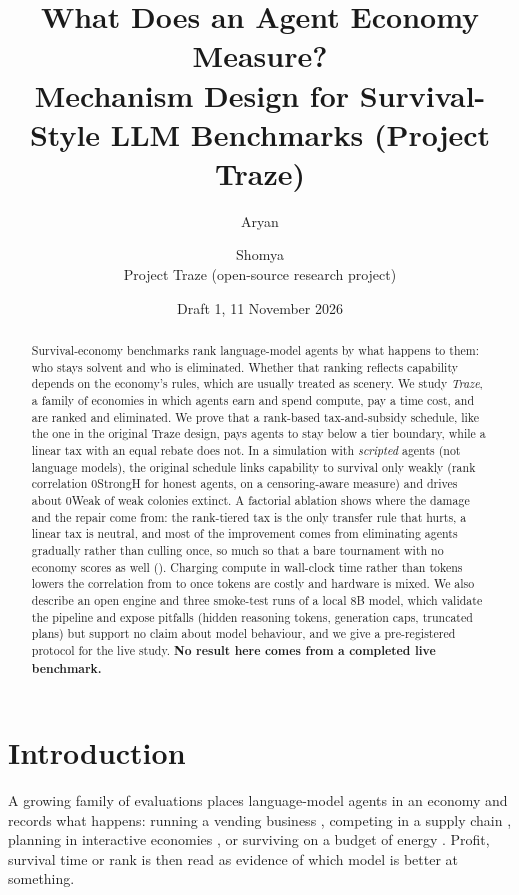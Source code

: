 \documentclass[11pt]{article}
\title{\textbf{What Does an Agent Economy Measure?}\\[2pt]
\Large Mechanism Design for Survival-Style LLM Benchmarks (Project Traze)}
\author{Aryan \and Shomya \\[2pt]
\small Project Traze (open-source research project) \\
\small \todo{full names, affiliations, contact e-mail}}
\date{Draft 1, 11 November 2026}
\theoremstyle{plain}
\theoremstyle{remark}
\begin{document}
\maketitle

\begin{abstract}
\noindent
Survival-economy benchmarks rank language-model agents by what happens to them: who stays solvent and who is eliminated. Whether that ranking reflects capability depends on the economy's rules, which are usually treated as scenery.
We study \emph{Traze}, a family of economies in which agents earn and spend compute, pay a time cost, and are ranked and eliminated.
We prove that a rank-based tax-and-subsidy schedule, like the one in the original Traze design, pays agents to stay below a tier boundary, while a linear tax with an equal rebate does not.
In a simulation with \emph{scripted} agents (not language models), the original schedule links capability to survival only weakly (rank correlation \ValM0StrongH{} for honest agents, \CindexMZeroH{} on a censoring-aware measure) and drives about \ExtM0Weak{} of weak colonies extinct.
A factorial ablation shows where the damage and the repair come from: the rank-tiered tax is the only transfer rule that hurts, a linear tax is neutral, and most of the improvement comes from eliminating agents gradually rather than culling once, so much so that a bare tournament with no economy scores as well (\ValBaseline).
Charging compute in wall-clock time rather than tokens lowers the correlation from \HwTokFour{} to \HwTimeFour{} once tokens are costly and hardware is mixed.
We also describe an open engine and three smoke-test runs of a local 8B model, which validate the pipeline and expose pitfalls (hidden reasoning tokens, generation caps, truncated plans) but support no claim about model behaviour, and we give a pre-registered protocol for the live study.
\textbf{No result here comes from a completed live benchmark.}
\end{abstract}

\section{Introduction}
\label{sec:intro}

A growing family of evaluations places language-model agents in an economy and records what happens: running a vending business \citep{backlund2025vendingbench}, competing in a supply chain \citep{zheng2026marketbench,sugiura2026coffeebench}, planning in interactive economies \citep{hu2026ecogym}, or surviving on a budget of energy \citep{hansen2026energy}. Profit, survival time or rank is then read as evidence of which model is better at something.
\end{document}
